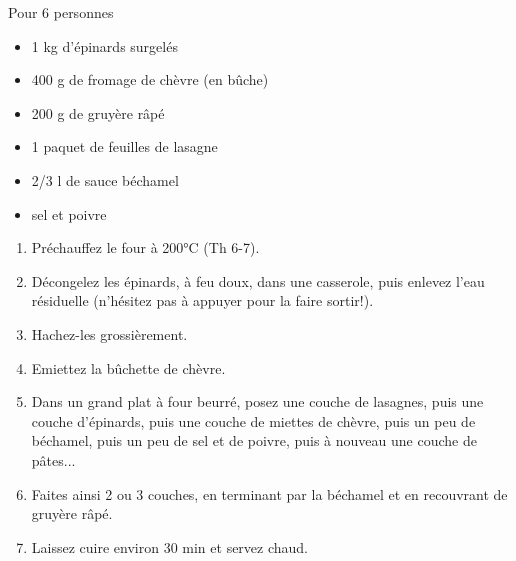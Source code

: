 \bigskip
{}
{Pour 6 personnes}{\begin{itemize}
	\item 1 kg d'épinards surgelés
	\item 400 g de fromage de chèvre (en bûche)
	\item 200 g de gruyère râpé
	\item 1 paquet de feuilles de lasagne
	\item 2/3 l de sauce béchamel
	\item sel et poivre
\end{itemize}}
{\begin{enumerate}
	\item Préchauffez le four à 200°C (Th 6-7).
	\item Décongelez les épinards, à feu doux, dans une casserole, puis enlevez l'eau résiduelle (n'hésitez pas à appuyer pour la faire sortir!).
	\item Hachez-les grossièrement.
	\item Emiettez la bûchette de chèvre.
	\item Dans un grand plat à four beurré, posez une couche de lasagnes, puis une couche d'épinards, puis une couche de miettes de chèvre, puis un peu de béchamel, puis un peu de sel et de poivre, puis à nouveau une couche de pâtes...
	\item Faites ainsi 2 ou 3 couches, en terminant par la béchamel et en recouvrant de gruyère râpé.
	\item Laissez cuire environ 30 min et servez chaud.
\end{enumerate}}

